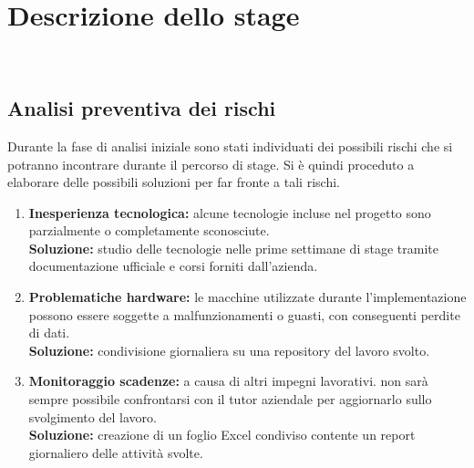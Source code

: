 
\chapter{Descrizione dello stage}
\label{cap:descrizione-stage}

\\


\section{Analisi preventiva dei rischi}

Durante la fase di analisi iniziale sono stati individuati dei possibili rischi che si potranno incontrare durante il percorso di stage. Si è quindi proceduto a elaborare delle possibili soluzioni per far fronte a tali rischi.

\begin{enumerate}
    \item \textbf{Inesperienza tecnologica:} alcune tecnologie incluse nel progetto sono parzialmente o completamente sconosciute.\\
    \textbf{Soluzione:} studio delle tecnologie nelle prime settimane di stage tramite documentazione ufficiale e corsi forniti dall'azienda.
    \item \textbf{Problematiche hardware:} le macchine utilizzate durante l'implementazione possono essere soggette a malfunzionamenti o guasti, con conseguenti perdite di dati.\\
    \textbf{Soluzione:} condivisione giornaliera su una repository del lavoro svolto.
    \item \textbf{Monitoraggio scadenze:} a causa di altri impegni lavorativi. non sarà sempre possibile confrontarsi con il tutor aziendale per aggiornarlo sullo svolgimento del lavoro.\\
    \textbf{Soluzione:} creazione di un foglio Excel condiviso contente un report giornaliero delle attività svolte.
\end{enumerate}

